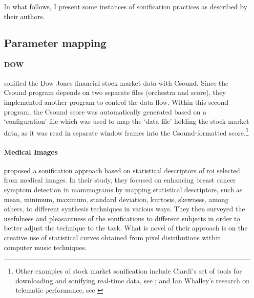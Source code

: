 \documentclass[
]{book}
\begin{document}
In what follows, I present some instances of sonification practices as described by their authors.

\subsection{Parameter mapping}
\label{sonification:parametermapping}

\paragraph{DOW}
\textcite{icmc/bbp2372.1996.085} sonified the Dow Jones financial stock market data with Csound. Since the Csound program depends on two separate files (orchestra and score), they implemented another program to control the data flow. Within this second program, the Csound score was automatically generated based on a `configuration' file which was used to map the `data file' holding the stock market data, as it was read in separate window frames into the Csound-formatted score.\footnote{Other examples of stock market sonification include Ciardi's set of tools for downloading and sonifying real-time data, see \textcite{icmc/bbp2372.2004.124}; and Ian Whalley's research on telematic performance, see \textcite{icmc/bbp2372.2014.046}}

\paragraph{Medical Images}
\textcite{DBLP:conf/icmc/CadizCMMATI15} proposed a sonification approach based on statistical descriptors of \gls{roi} selected from medical images. In their study, they focused on enhancing breast cancer symptom detection in mammograms by mapping statistical descriptors, such as mean, minimum, maximum, standard deviation, kurtosis, skewness, among others, to different synthesis techniques in various ways. They then surveyed the usefulness and pleasantness of the sonifications to different subjects in order to better adjust the technique to the task. What is novel of their approach is on the creative use of statistical curves obtained from pixel distributions within computer music techniques.

\end{document}
